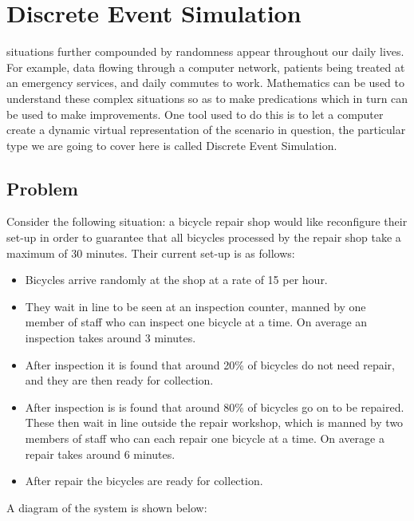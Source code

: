 \chapter[Discrete Event Simulation]{Discrete Event Simulation}

 situations further compounded by randomness appear
throughout our daily lives. For example, data flowing through a computer
network, patients being treated at an emergency services, and daily commutes to
work.
Mathematics can be used to understand these complex situations so as to
make predications which in turn can be used to make improvements. One tool used
to do this is to let a computer create a dynamic virtual representation of the
scenario in question, the particular type we are going to cover here is called
Discrete Event Simulation.

\section{Problem}\label{sec:problem}

Consider the following situation: a bicycle repair shop would like reconfigure
their set-up in order to guarantee that all bicycles processed by the repair
shop take a maximum of 30 minutes.
Their current set-up is as follows:

\begin{itemize}
  \item Bicycles arrive randomly at the shop at a rate of 15 per hour.
  \item They wait in line to be seen at an inspection counter, manned by one
  member of staff who can inspect one bicycle at a time. On average an
  inspection takes around 3 minutes.
  \item After inspection it is found that around 20\% of bicycles do not need
  repair, and they are then ready for collection.
  \item After inspection is is found that around 80\% of bicycles go on to be
  repaired. These then wait in line outside the repair workshop, which is manned
  by two members of staff who can each repair one bicycle at a time. On average
  a repair takes around 6 minutes.
  \item After repair the bicycles are ready for collection.
\end{itemize}

A diagram of the system is shown below:



